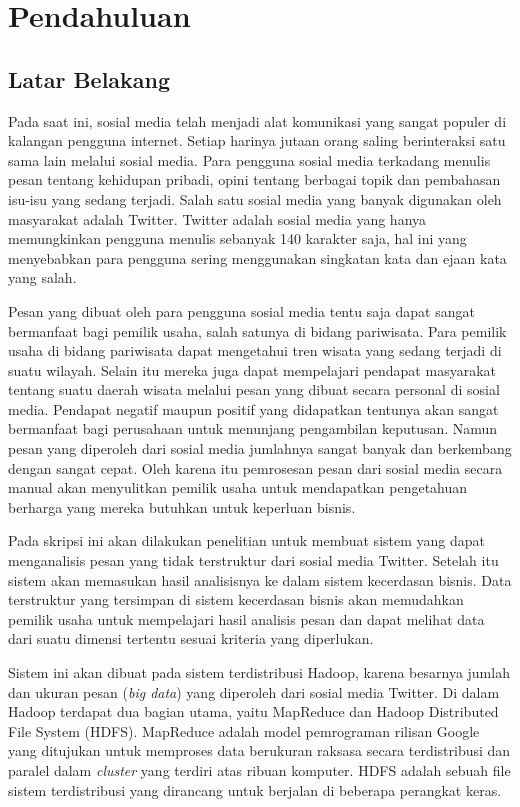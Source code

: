 \chapter{Pendahuluan}
\label{chap:pendahuluan}

\section{Latar Belakang}
\label{sec:latar_belakang}
Pada saat ini, sosial media telah menjadi alat komunikasi yang sangat populer di kalangan pengguna internet. Setiap harinya jutaan orang saling berinteraksi satu sama lain melalui sosial media. Para pengguna sosial media terkadang menulis pesan tentang kehidupan pribadi, opini tentang berbagai topik dan pembahasan isu-isu yang sedang terjadi. Salah satu sosial media yang banyak digunakan oleh masyarakat adalah Twitter. Twitter adalah sosial media yang hanya memungkinkan pengguna menulis sebanyak 140 karakter saja, hal ini yang menyebabkan para pengguna sering menggunakan singkatan kata dan ejaan kata yang salah.

Pesan yang dibuat oleh para pengguna sosial media tentu saja dapat sangat bermanfaat bagi pemilik usaha, salah satunya di bidang pariwisata. Para pemilik usaha di bidang pariwisata dapat mengetahui tren wisata yang sedang terjadi di suatu wilayah. Selain itu mereka  juga dapat mempelajari pendapat masyarakat tentang suatu daerah wisata melalui pesan yang dibuat secara personal di sosial media. Pendapat negatif maupun positif yang didapatkan tentunya akan sangat bermanfaat bagi perusahaan untuk menunjang pengambilan keputusan. Namun pesan yang diperoleh dari sosial media jumlahnya sangat banyak dan berkembang dengan sangat cepat. Oleh karena itu pemrosesan pesan dari sosial media secara manual akan menyulitkan pemilik usaha untuk mendapatkan pengetahuan berharga yang mereka butuhkan untuk keperluan bisnis.

Pada skripsi ini akan dilakukan penelitian untuk membuat sistem yang dapat menganalisis pesan yang tidak terstruktur dari sosial media Twitter. Setelah itu sistem akan memasukan hasil analisisnya ke dalam sistem kecerdasan bisnis. Data terstruktur yang tersimpan di sistem kecerdasan bisnis akan memudahkan pemilik usaha untuk mempelajari hasil analisis pesan dan dapat melihat data dari suatu dimensi tertentu sesuai kriteria yang diperlukan. 

Sistem ini akan dibuat pada sistem terdistribusi Hadoop, karena besarnya jumlah dan ukuran pesan (\textit{big data}) yang diperoleh dari sosial media Twitter. Di dalam Hadoop terdapat dua bagian utama, yaitu MapReduce dan Hadoop Distributed File System (HDFS). MapReduce adalah model pemrograman rilisan Google yang ditujukan untuk memproses data berukuran raksasa secara terdistribusi dan paralel dalam \textit{cluster} yang terdiri atas ribuan komputer. HDFS adalah sebuah file sistem terdistribusi yang dirancang untuk berjalan di beberapa perangkat keras.

